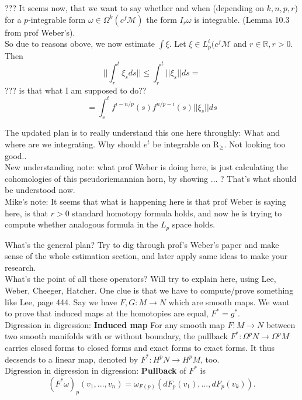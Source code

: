 \documentclass[licencjacka]{pracamgr}
\begin{document}
??? It seems now, that we want to say whether and when (depending on
$k, n, p, r$) for a $p$-integrable form $\omega \in \Omega^k(c^f\mathcal{M})$
the form $I_r\omega$ is integrable. (Lemma 10.3 from prof Weber's). \\

So due to reasons obove, we now estimate $\int \xi$. Let $\xi \in
L_p^i(c^f\mathcal{M}$ and $ r \in \mathbb{R}, r > 0$. Then
\[
    ||\int_r^t \xi_s ds || \leq \int_r^t ||\xi_s||ds =
\]
??? is that what I am supposed to do??
\[

    = \int_s^t f^{i-n/p}(s) f^{n/p-i}(s) ||\xi_s||ds
\]


The updated plan is to really understand this one here throughly:
What and where are we integrating. Why should $e^t$ be integrable 
on $\mathrm{R}_\geq$. Not looking too good.. \\

New understanding note: what prof Weber is doing here, is just calculating the 
cohomologies of this pseudoriemannian horn, by showing ... ? That's what should
be understood now. \\



\scriptsize
Mike's note:
It seems that what is happening here is that prof Weber is saying here,
is that $r>0$ standard homotopy formula holds, and now he is trying
to compute whether analogous formula in the $L_p$ space holds.


What's the general plan? Try to dig through prof's Weber's paper and
make sense of the whole estimation section, and later apply same ideas
to make your research. \\

What's the point of all these operators? Will try to
explain here, using Lee, Weber, Cheeger, Hatcher.  One clue is that we
have to compute/prove something like Lee, page 444.  Say we have $F,G:
M \rightarrow N$ which are smooth maps. We want to prove that induced
maps at the homotopies are equal, $F^\ast = g^\ast$. \\

Digression in digression: \textbf{Induced map} For any smooth map $F:
M \rightarrow N$ between two smooth manifolds with or without
boundary, the pullback $F^\ast: \Omega^p N \rightarrow \Omega^p M$
carries closed forms to closed forms and exact forms to exact
forms. It thus decsends to a linear map, denoted by $F^\ast: H^p N
\rightarrow H^p M$, too. \\

Digression in digression in digression: \textbf{Pullback} of $F^\ast$ is
\[
    (F^\ast \omega)_p(v_1, ..., v_n) =
        \omega_{F(p)}(dF_p(v_1), ..., dF_p(v_k)).
\] \\
\end{document}
